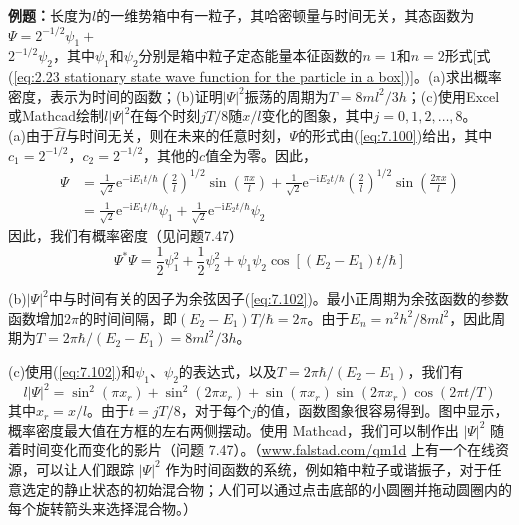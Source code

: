     \begin{examplebox}
        \textbf{例题：}长度为$l$的一维势箱中有一粒子，其哈密顿量与时间无关，其态函数为$\Psi = 2^{-1/2}\psi_1+ $\\$ 2^{-1/2}\psi_2$，其中$\psi_1$和$\psi_2$分别是箱中粒子定态能量本征函数的$n=1$和$n=2$形式[式(\ref{eq:2.23 stationary state wave function for the particle in a box})]。(a)求出概率密度，表示为时间的函数；(b)证明$\left|\Psi\right|^2$振荡的周期为$T = 8ml^2/3h$；(c)使用Excel或Mathcad绘制$l\left|\Psi\right|^2$在每个时刻$jT/8$随$x/l$变化的图象，其中$j=0,1,2,\ldots,8$。
        \\

        (a)由于$\hat{H}$与时间无关，则在未来的任意时刻，$\Psi$的形式由(\ref{eq:7.100})给出，其中$c_1=2^{-1/2}$，$c_2=2^{-1/2}$，其他的$c$值全为零。因此，
        \begin{equation*}
            \begin{aligned}
                \Psi &= \frac{1}{\sqrt{2}}\mathrm{e}^{-\mathrm{i}E_1t/\hbar}\left(\frac{2}{l}\right)^{1/2}\sin\left(\frac{\pi x}{l}\right) + \frac{1}{\sqrt{2}}\mathrm{e}^{-\mathrm{i}E_2t/\hbar}\left(\frac{2}{l}\right)^{1/2}\sin\left(\frac{2\pi x}{l}\right) \\
                & = \frac{1}{\sqrt{2}}\mathrm{e}^{-\mathrm{i}E_1t/\hbar}\psi_1 + \frac{1}{\sqrt{2}}\mathrm{e}^{-\mathrm{i}E_2t/\hbar}\psi_2
            \end{aligned}
        \end{equation*}
        因此，我们有概率密度（见问题7.47）
        \begin{equation}
            \Psi^{\ast}\Psi = \frac{1}{2}\psi_1^2+\frac{1}{2}\psi_2^2 + \psi_1\psi_2\cos\left[\left(E_2-E_1\right)t/\hbar\right]
            \label{eq:7.102}
        \end{equation}

        (b)$\left|\Psi\right|^2$中与时间有关的因子为余弦因子(\ref{eq:7.102})。最小正周期为余弦函数的参数函数增加$2\pi$的时间间隔，即$\left(E_2-E_1\right)T/\hbar = 2\pi$。由于$E_n = n^2h^2/8ml^2$，因此周期为$T = 2\pi\hbar/\left(E_2-E_1\right) = 8ml^2/3h$。

        (c)使用(\ref{eq:7.102})和$\psi_1$、$\psi_2$的表达式，以及$T = 2\pi\hbar/\left(E_2-E_1\right)$，我们有
        \begin{equation}
            l\left|\Psi\right|^2 = \sin^2\left(\pi x_r\right) + \sin^2\left(2\pi x_r\right) + \sin\left(\pi x_r\right)\sin\left(2\pi x_r\right)\cos\left(2\pi t/T\right)
            \label{eq:7.103}
        \end{equation}
        其中$x_r = x/l$。由于$t = jT/8$，对于每个$j$的值，函数图象很容易得到。图中显示，概率密度最大值在方框的左右两侧摆动。使用 Mathcad，我们可以制作出 $\left|\Psi\right|^2$ 随着时间变化而变化的影片（问题 7.47）。（\url{www.falstad.com/qm1d} 上有一个在线资源，可以让人们跟踪 $\left|\Psi\right|^2$ 作为时间函数的系统，例如箱中粒子或谐振子，对于任意选定的静止状态的初始混合物；人们可以通过点击底部的小圆圈并拖动圆圈内的每个旋转箭头来选择混合物。）
    \end{examplebox}

